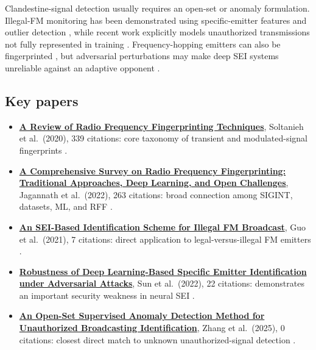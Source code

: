\documentclass[
  10pt,
]{article}
\providecommand{\tightlist}{%
  \setlength{\itemsep}{0pt}\setlength{\parskip}{0pt}}
\begin{document}
Clandestine-signal detection usually requires an open-set or anomaly
formulation. Illegal-FM monitoring has been demonstrated using
specific-emitter features and outlier detection \citep{guo2021}, while
recent work explicitly models unauthorized transmissions not fully
represented in training \citep{zhang2025open}. Frequency-hopping
emitters can also be fingerprinted \citep{kang2021}, but adversarial
perturbations may make deep SEI systems unreliable against an adaptive
opponent \citep{sun2022}.

\subsection{Key papers}\label{key-papers-3}

\begin{itemize}
\tightlist
\item
  \href{https://consensus.app/papers/details/1c3cd42586205e0280356e90cb7ab147/?utm_source=chatgpt}{\textbf{A
  Review of Radio Frequency Fingerprinting Techniques}}, Soltanieh et
  al.~(2020), 339 citations: core taxonomy of transient and
  modulated-signal fingerprints \citep{soltanieh2020}.
\item
  \href{https://consensus.app/papers/details/85a1acc05180584992b4bd752a62599e/?utm_source=chatgpt}{\textbf{A
  Comprehensive Survey on Radio Frequency Fingerprinting: Traditional
  Approaches, Deep Learning, and Open Challenges}}, Jagannath et
  al.~(2022), 263 citations: broad connection among SIGINT, datasets,
  ML, and RFF \citep{jagannath2022}.
\item
  \href{https://consensus.app/papers/details/b81586a8d9ee5753a4b48df60568f585/?utm_source=chatgpt}{\textbf{An
  SEI-Based Identification Scheme for Illegal FM Broadcast}}, Guo et
  al.~(2021), 7 citations: direct application to legal-versus-illegal FM
  emitters \citep{guo2021}.
\item
  \href{https://consensus.app/papers/details/29ea0ff4b51857cca284e60d8c9c9d19/?utm_source=chatgpt}{\textbf{Robustness
  of Deep Learning-Based Specific Emitter Identification under
  Adversarial Attacks}}, Sun et al.~(2022), 22 citations: demonstrates
  an important security weakness in neural SEI \citep{sun2022}.
\item
  \href{https://consensus.app/papers/details/66ce93d9ddd05433ac370321a0d58745/?utm_source=chatgpt}{\textbf{An
  Open-Set Supervised Anomaly Detection Method for Unauthorized
  Broadcasting Identification}}, Zhang et al.~(2025), 0 citations:
  closest direct match to unknown unauthorized-signal detection
  \citep{zhang2025open}.
\end{itemize}
\end{document}
